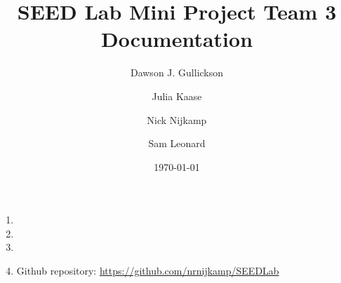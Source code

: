 \documentclass{article}
\title{SEED Lab Mini Project Team 3 Documentation}
\author{
    Dawson J. Gullickson
    \and
    Julia Kaase
    \and
    Nick Nijkamp
    \and
    Sam Leonard
}
\date{\today}
\begin{document}
    \maketitle
	
    \begin{enumerate}
        \item 
        
        \item 

        \item 

        \item Github repository: \url{https://github.com/nrnijkamp/SEEDLab}
    \end{enumerate}
\end{document}
